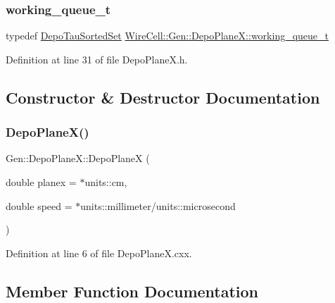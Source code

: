 \subsubsection{\texorpdfstring{working\+\_\+queue\+\_\+t}{working\_queue\_t}}
{\footnotesize\ttfamily typedef \hyperlink{namespace_wire_cell_ac01bef08345e4a479b147822eef2a405}{Depo\+Tau\+Sorted\+Set} \hyperlink{class_wire_cell_1_1_gen_1_1_depo_plane_x_ade1129aabbdd7bc1d4e880169d715a19}{Wire\+Cell\+::\+Gen\+::\+Depo\+Plane\+X\+::working\+\_\+queue\+\_\+t}}



Definition at line 31 of file Depo\+Plane\+X.\+h.



\subsection{Constructor \& Destructor Documentation}
\mbox{\label{class_wire_cell_1_1_gen_1_1_depo_plane_x_accbd66291fc864d1b5fb10a6d687a50f}} 
\subsubsection{\texorpdfstring{Depo\+Plane\+X()}{DepoPlaneX()}}
{\footnotesize\ttfamily Gen\+::\+Depo\+Plane\+X\+::\+Depo\+PlaneX (\begin{DoxyParamCaption}\item[{double}]{planex = {$\ast$units\+:\+:cm},  }\item[{double}]{speed = {$\ast$units\+:\+:millimeter/units\+:\+:microsecond} }\end{DoxyParamCaption})}



Definition at line 6 of file Depo\+Plane\+X.\+cxx.



\subsection{Member Function Documentation}
\mbox{\label{class_wire_cell_1_1_gen_1_1_depo_plane_x_aac384ecc32db5e99b6ed308ff45e14de}} 
